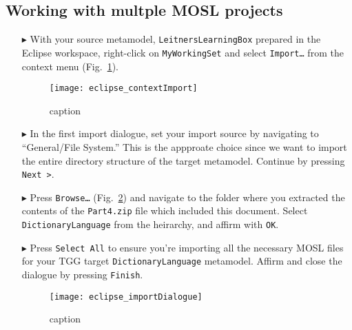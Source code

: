 \newpage
\subsection{Working with multple MOSL projects}
\texHeader
\label{sec:multiMOSL}


\begin{itemize}

\item[$\blacktriangleright$] With your source metamodel, \texttt{LeitnersLearningBox} prepared in the Eclipse workspace, right-click on \texttt{MyWorkingSet}
and select \texttt{Import\ldots} from the context menu (Fig.~\ref{fig:eclipseContextImport}).

\begin{figure}[htbp]
\begin{center}
  \texttt{[image: eclipse\_contextImport]}
  \caption{caption}
  \label{fig:eclipseContextImport}
\end{center}
\end{figure}

\item[$\blacktriangleright$] In the first import dialogue, set your import source by navigating to ``General/File System.'' This is the appproate choice since
we want to import the entire directory structure of the target metamodel. Continue by pressing \texttt{Next >}.

\item[$\blacktriangleright$] Press \texttt{Browse\ldots} (Fig.~\ref{fig:importFileSys}) and navigate to the folder where you extracted the contents of the
\texttt{Part4.zip} file which included this document. Select \texttt{DictionaryLanguage} from the heirarchy, and affirm with \texttt{OK}.

\item[$\blacktriangleright$] Press \texttt{Select All} to ensure you're importing all the necessary MOSL files for your TGG target \texttt{DictionaryLanguage}
metamodel. Affirm and close the dialogue by pressing \texttt{Finish}.

\begin{figure}[htbp]
\begin{center}
  \texttt{[image: eclipse\_importDialogue]}
  \caption{caption}
  \label{fig:importFileSys}
\end{center}
\end{figure}


\end{itemize}
